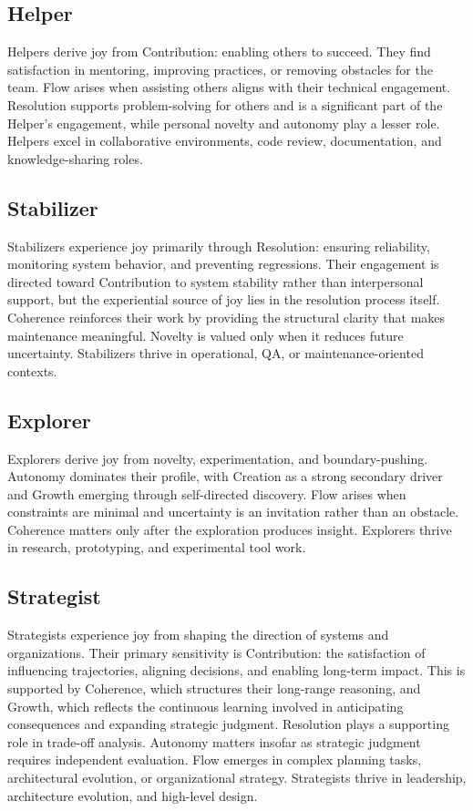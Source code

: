 \documentclass[12pt]{elsarticle}
\begin{document}
\subsection{Helper}
Helpers derive joy from Contribution: enabling others to succeed. They find
satisfaction in mentoring, improving practices, or removing obstacles for the
team. Flow arises when assisting others aligns with their technical engagement.
Resolution supports problem-solving for others and is a significant part of the 
Helper's engagement, while personal novelty and autonomy play a lesser role. 
Helpers excel in collaborative environments, code review, 
documentation, and knowledge-sharing roles.

\subsection{Stabilizer}
Stabilizers experience joy primarily through Resolution: ensuring reliability, 
monitoring system behavior, and preventing regressions. Their engagement is 
directed toward Contribution to system stability rather than interpersonal 
support, but the experiential source of joy lies in the resolution process 
itself. Coherence reinforces their work by providing the structural clarity 
that makes maintenance meaningful. Novelty is valued only when it reduces 
future uncertainty. Stabilizers thrive in operational, QA, or 
maintenance-oriented contexts.

\subsection{Explorer}
Explorers derive joy from novelty, experimentation, and boundary-pushing.
Autonomy dominates their profile, with Creation as a strong secondary driver 
and Growth emerging through self-directed discovery. Flow arises when 
constraints are minimal and uncertainty is an invitation rather than an 
obstacle. Coherence matters only after the exploration produces insight. 
Explorers thrive in research, prototyping, and experimental tool work.

\subsection{Strategist}
Strategists experience joy from shaping the direction of systems and 
organizations. Their primary sensitivity is Contribution: the satisfaction of 
influencing trajectories, aligning decisions, and enabling long-term impact. 
This is supported by Coherence, which structures their long-range reasoning, 
and Growth, which reflects the continuous learning involved in anticipating 
consequences and expanding strategic judgment. Resolution plays a supporting 
role in trade-off analysis. Autonomy matters insofar as strategic judgment 
requires independent evaluation. Flow emerges in complex planning tasks, 
architectural evolution, or organizational strategy. Strategists thrive in 
leadership, architecture evolution, and high-level design.
\end{document}
